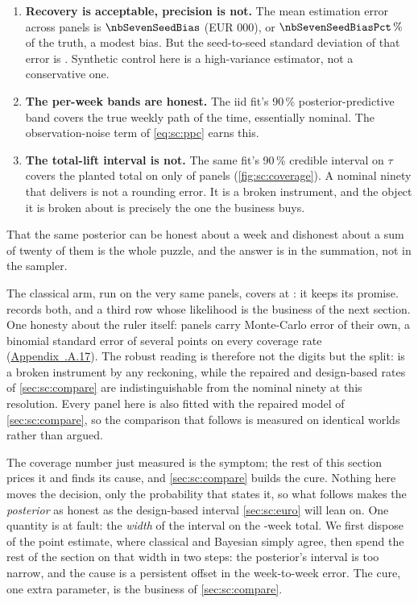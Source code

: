 \begin{enumerate}[leftmargin=*]
  \item \textbf{Recovery is acceptable, precision is not.} The mean estimation error across panels
        is $\nbSevenSeedBias$ (EUR 000), or $\nbSevenSeedBiasPct\,\%$ of the truth, a modest
        bias. But the seed-to-seed standard deviation of that error is \keur{\nbSevenSeedSd}.
        Synthetic control here is a high-variance estimator, not a conservative one.
  \item \textbf{The per-week bands are honest.} The iid fit's 90\,\% posterior-predictive band
        covers the true weekly path \pc{\nbSevenWeekCov} of the time, essentially nominal. The
        observation-noise term of \cref{eq:sc:ppc} earns this.
  \item \textbf{The total-lift interval is not.} The same fit's 90\,\% credible interval on $\tau$
        covers the planted total on only \pc{\nbSevenTotalCov} of panels (\cref{fig:sc:coverage}). A nominal ninety that
        delivers \pc{\nbSevenTotalCov} is not a rounding error. It is a broken instrument, and
        the object it is broken about is precisely the one the business buys.
\end{enumerate}

That the same posterior can be honest about a week and dishonest about a sum of twenty of them is
the whole puzzle, and the answer is in the summation, not in the sampler.



The classical arm, run on the very same panels, covers at \pc{\nbSevenRiCov}: it keeps its
promise.  records both, and a third row whose likelihood is the business of
the next section. One honesty about the ruler itself: \nbSevenNPanels{} panels carry Monte-Carlo
error of their own, a binomial standard error of several points on every coverage rate
(\hyperref[app:sc:mcerr]{Appendix~\thechapter.A.17}). The robust reading is therefore not the
digits but the split: \pc{\nbSevenTotalCov} is a broken instrument by any reckoning, while the
repaired and design-based rates of \cref{sec:sc:compare} are indistinguishable from the nominal
ninety at this resolution. Every panel here is also fitted with the repaired model of
\cref{sec:sc:compare}, so the comparison that follows is measured on identical worlds rather than
argued.

The coverage number just measured is the symptom; the rest of this section prices it and finds its
cause, and \cref{sec:sc:compare} builds the cure. Nothing here moves the decision, only the
probability that states it, so what follows makes the \emph{posterior} as honest as the design-based
interval \cref{sec:sc:euro} will lean on. One quantity is at fault: the \emph{width}
of the interval on the \nbSevenNPost-week total. We first dispose of the point estimate, where
classical and Bayesian simply agree, then spend the rest of the section on that width in two steps:
the posterior's interval is too narrow, and the cause is a persistent offset in the week-to-week
error. The cure, one extra parameter, is the business of \cref{sec:sc:compare}.

